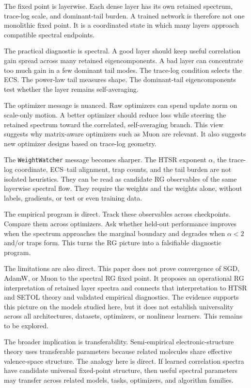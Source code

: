 \documentclass[10pt,twocolumn]{article}
\newcommand{\WW}{\texttt{WeightWatcher}}
\begin{document}
The fixed point is layerwise. Each dense layer has its own retained spectrum, trace-log scale, and dominant-tail burden. A trained network is therefore not one monolithic fixed point. It is a coordinated state in which many layers approach compatible spectral endpoints.

The practical diagnostic is spectral. A good layer should keep useful correlation gain spread across many retained eigencomponents. A bad layer can concentrate too much gain in a few dominant tail modes. The trace-log condition selects the ECS. The power-law tail measures shape.
The dominant-tail eigencomponents test whether the layer remains self-averaging.

The optimizer message is nuanced.
Raw optimizers can spend update norm on scale-only motion. A better optimizer should reduce loss while steering the retained spectrum toward the correlated, self-averaging branch. This view suggests why matrix-aware optimizers such as Muon are relevant. It also suggests new optimizer designs based on trace-log geometry.

The \WW{} message becomes sharper. The HTSR exponent $\alpha$, the trace-log coordinate, ECS--tail alignment, trap counts,
and the tail burden are not isolated heuristics.
They can be read as candidate RG observables of the same layerwise spectral flow.
They require the weights and the weights alone, without labels, gradients, or test or even training data.

The empirical program is direct.
Track these observables across checkpoints. Compare them across optimizers.
Ask whether held-out performance improves when the spectrum approaches the
marginal boundary and degrades when $\alpha<2$ and/or traps form.
This turns the RG picture into a falsifiable diagnostic program.

The limitations are also direct.
This paper does not prove convergence of SGD, AdamW, or Muon to the spectral RG fixed point.
It proposes an operational RG interpretation of retained layer spectra and connects that interpretation
to HTSR and SETOL theory and validated empirical diagnostics.
The evidence supports this picture on the models studied here, but it does not establish universality
across all architectures, datasets, optimizers, or nonlinear learners.  This remains to be explored.

The broader implication is transferability. Semi-empirical electronic-structure
theory uses transferable parameters because related molecules share effective valence-space structure.
The analogy here is direct. If learned correlation spectra have candidate universal fixed-point structure,
then useful spectral parameters may transfer across related models, tasks, optimizers, and algorithm families.
\end{document}
